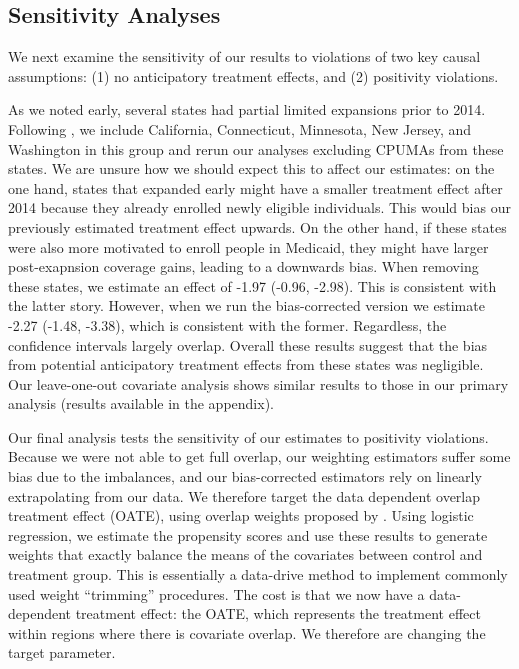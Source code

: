 \documentclass[12pt]{article}
\begin{document}
\subsection{Sensitivity Analyses}

We next examine the sensitivity of our results to violations of two key causal assumptions: (1) no anticipatory treatment effects, and (2) positivity violations.

As we noted early, several states had partial limited expansions prior to 2014. Following \cite{frean2017premium}, we include California, Connecticut, Minnesota, New Jersey, and Washington in this group and rerun our analyses excluding CPUMAs from these states. We are unsure how we should expect this to affect our estimates: on the one hand, states that expanded early might have a smaller treatment effect after 2014 because they already enrolled newly eligible individuals. This would bias our previously estimated treatment effect upwards. On the other hand, if these states were also more motivated to enroll people in Medicaid, they might have larger post-exapnsion coverage gains, leading to a downwards bias. When removing these states, we estimate an effect of -1.97 (-0.96, -2.98). This is consistent with the latter story. However, when we run the bias-corrected version we estimate -2.27 (-1.48, -3.38), which is consistent with the former. Regardless, the confidence intervals largely overlap. Overall these results suggest that the bias from potential anticipatory treatment effects from these states was negligible. Our leave-one-out covariate analysis shows similar results to those in our primary analysis (results available in the appendix).

Our final analysis tests the sensitivity of our estimates to positivity violations. Because we were not able to get full overlap, our weighting estimators suffer some bias due to the imbalances, and our bias-corrected estimators rely on linearly extrapolating from our data. We therefore target the data dependent overlap treatment effect (OATE), using overlap weights proposed by \cite{li2018balancing}. Using logistic regression, we estimate the propensity scores and use these results to generate weights that exactly balance the means of the covariates between control and treatment group. This is essentially a data-drive method to implement commonly used weight ``trimming'' procedures. The cost is that we now have a data-dependent treatment effect: the OATE, which represents the treatment effect within regions where there is covariate overlap. We therefore are changing the target parameter.
\end{document}
